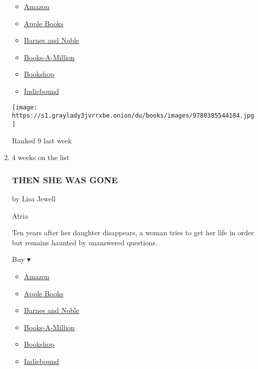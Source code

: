 \begin{enumerate}
  \begin{itemize}
  \tightlist
  \item
    \href{https://www.amazon.com/Guardians-Novel-John-Grisham/dp/0385544189?tag=NYTBS-20}{Amazon}
  \item
    \href{https://du-gae-books-dot-nyt-du-prd.appspot.com/buy?title=THE+GUARDIANS\&author=John+Grisham}{Apple
    Books}
  \item
    \href{https://www.anrdoezrs.net/click-7990613-11819508?url=https\%3A\%2F\%2Fwww.barnesandnoble.com\%2Fw\%2F\%3Fean\%3D9780525620945}{Barnes
    and Noble}
  \item
    \href{https://www.anrdoezrs.net/click-7990613-35140?url=https\%3A\%2F\%2Fwww.booksamillion.com\%2Fp\%2FTHE\%2BGUARDIANS\%2FJohn\%2BGrisham\%2F9780525620945}{Books-A-Million}
  \item
    \href{https://bookshop.org/a/3546/9780525620945}{Bookshop}
  \item
    \href{https://www.indiebound.org/book/9780525620945?aff=NYT}{Indiebound}
  \end{itemize}

  \texttt{[image: https://s1.graylady3jvrrxbe.onion/du/books/images/9780385544184.jpg]}

  Ranked 9 last week
\item
  4 weeks on the list

  \hypertarget{then-she-was-gone}{%
  \subsubsection{THEN SHE WAS GONE}\label{then-she-was-gone}}

  by Lisa Jewell

  Atria

  Ten years after her daughter disappears, a woman tries to get her life
  in order but remains haunted by unanswered questions.

  Buy ▾

  \begin{itemize}
  \tightlist
  \item
    \href{https://www.amazon.com/Then-She-Was-Gone-Novel-ebook/dp/B074MDD3H6?tag=NYTBS-20}{Amazon}
  \item
    \href{https://du-gae-books-dot-nyt-du-prd.appspot.com/buy?title=THEN+SHE+WAS+GONE\&author=Lisa+Jewell}{Apple
    Books}
  \item
    \href{https://www.anrdoezrs.net/click-7990613-11819508?url=https\%3A\%2F\%2Fwww.barnesandnoble.com\%2Fw\%2F\%3Fean\%3D9781501154652}{Barnes
    and Noble}
  \item
    \href{https://www.anrdoezrs.net/click-7990613-35140?url=https\%3A\%2F\%2Fwww.booksamillion.com\%2Fp\%2FTHEN\%2BSHE\%2BWAS\%2BGONE\%2FLisa\%2BJewell\%2F9781501154652}{Books-A-Million}
  \item
    \href{https://bookshop.org/a/3546/9781501154652}{Bookshop}
  \item
    \href{https://www.indiebound.org/book/9781501154652?aff=NYT}{Indiebound}
  \end{itemize}


\end{enumerate}
